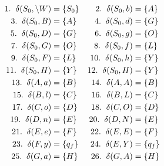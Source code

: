 \documentclass[a4paper,10pt]{article}
\begin{document}
	\begin{align*}
		1. \hspace{2mm} \delta(S_0, \backslash W) &= \{S_0\} & 2. \hspace{2mm} \delta(S_0, b) &= \{A\}  \\ 
		3. \hspace{2mm} \delta(S_0, B) &= \{A\} & 4. \hspace{2mm} \delta(S_0, d) &= \{G\}  \\
		5. \hspace{2mm} \delta(S_0, D) &= \{G\} & 6. \hspace{2mm} \delta(S_0, g) &= \{O\}  \\
		7. \hspace{2mm} \delta(S_0, G) &= \{O\} & 8. \hspace{2mm} \delta(S_0, f) &= \{L\}  \\
		9. \hspace{2mm} \delta(S_0, F) &= \{L\} & 10. \hspace{2mm} \delta(S_0, h) &= \{Y\}  \\
		11. \hspace{2mm} \delta(S_0, H) &= \{Y\} & 12. \hspace{2mm} \delta(S_0, H) &= \{Y\}  \\
		13. \hspace{2mm} \delta(A, a) &= \{B\} & 14. \hspace{2mm} \delta(A, A) &= \{B\} \\
		15. \hspace{2mm} \delta(B, l) &= \{C\} & 16. \hspace{2mm} \delta(B, L) &= \{C\} \\
		17. \hspace{2mm} \delta(C, o) &= \{D\} & 18. \hspace{2mm} \delta(C, O) &= \{D\} \\
		19. \hspace{2mm} \delta(D, n) &= \{E\} & 20. \hspace{2mm} \delta(D, N) &= \{E\} \\
		21. \hspace{2mm} \delta(E, e) &= \{F\} & 22. \hspace{2mm} \delta(E, E) &= \{F\} \\
		23. \hspace{2mm} \delta(F, y) &= \{q_f\} & 24. \hspace{2mm} \delta(E, Y) &= \{q_f\} \\
		25. \hspace{2mm} \delta(G, a) &= \{H\} & 26. \hspace{2mm} \delta(G, A) &= \{H\} \\

\end{align*}
\end{document}
